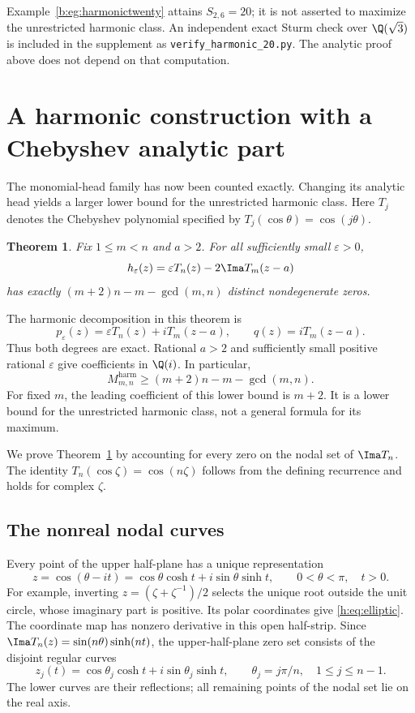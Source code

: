 \documentclass[UTF8,11pt]{ctexart}
\newtheorem{thm}{Theorem}[section]
\theoremstyle{definition}
\numberwithin{equation}{section}
\newcommand{\eps}{\varepsilon}\newcommand{\ep}{\varepsilon}
\begin{document}
Example~\ref{b:eg:harmonictwenty} attains $S_{2,6}=20$; it is not
asserted to maximize the unrestricted harmonic class.
An independent exact Sturm check over $\Q(\sqrt3)$ is included
in the supplement as \texttt{verify\_harmonic\_20.py}.
The analytic proof above does not depend on that computation.

\section{A harmonic construction with a Chebyshev analytic part}\label{h:sec:Cheb}
The monomial-head family has now been counted exactly. Changing its
analytic head yields a larger lower bound for the unrestricted harmonic
class. Here $T_j$ denotes the Chebyshev polynomial specified by
$T_j(\cos\theta)=\cos(j\theta)$.
\begin{thm}\label{h:thm:Cheb}
Fix $1\le m<n$ and $a>2$. For all sufficiently small $\eps>0$,
\begin{equation}\label{h:eq:Cheb}
 h_\eps(z)=\eps T_n(z)-2\Ima T_m(z-a)
\end{equation}
has exactly $(m+2)n-m-\gcd(m,n)$ distinct nondegenerate zeros.
\end{thm}

The harmonic decomposition in this theorem is
\[
 p_\eps(z)=\eps T_n(z)+iT_m(z-a),\qquad q(z)=iT_m(z-a).
\]
Thus both degrees are exact. Rational $a>2$ and sufficiently small positive
rational $\eps$ give coefficients in $\Q(i)$. In particular,
\begin{equation}\label{h:eq:harmoniclower}
 M^{\mathrm{harm}}_{m,n}\ge(m+2)n-m-\gcd(m,n).
\end{equation}
For fixed $m$, the leading coefficient of this lower bound is $m+2$.
It is a lower bound for the unrestricted harmonic class, not a general
formula for its maximum.


We prove Theorem~\ref{h:thm:Cheb} by accounting for every zero on the nodal
set of $\Ima T_n$. The identity $T_n(\cos\zeta)=\cos(n\zeta)$ follows
from the defining recurrence and holds for complex $\zeta$.

\subsection{The nonreal nodal curves}
Every point of the upper half-plane has a unique representation
\begin{equation}\label{h:eq:elliptic}
 z=\cos(\theta-it)
 =\cos\theta\cosh t+i\sin\theta\sinh t,
 \qquad 0<\theta<\pi,\quad t>0.
\end{equation}
For example, inverting $z=(\zeta+\zeta^{-1})/2$ selects the unique root
outside the unit circle, whose imaginary part is positive. Its polar
coordinates give \eqref{h:eq:elliptic}. The coordinate map has nonzero
derivative in this open half-strip.
Since $\Ima T_n(z)=\sin(n\theta)\sinh(nt)$, the upper-half-plane zero set
consists of the disjoint regular curves
\begin{equation}\label{h:eq:curves}
 z_j(t)=\cos\theta_j\cosh t+i\sin\theta_j\sinh t,
 \qquad \theta_j=j\pi/n,
 \quad 1\le j\le n-1.
\end{equation}
The lower curves are their reflections; all remaining points of the
nodal set lie on the real axis.
\end{document}
